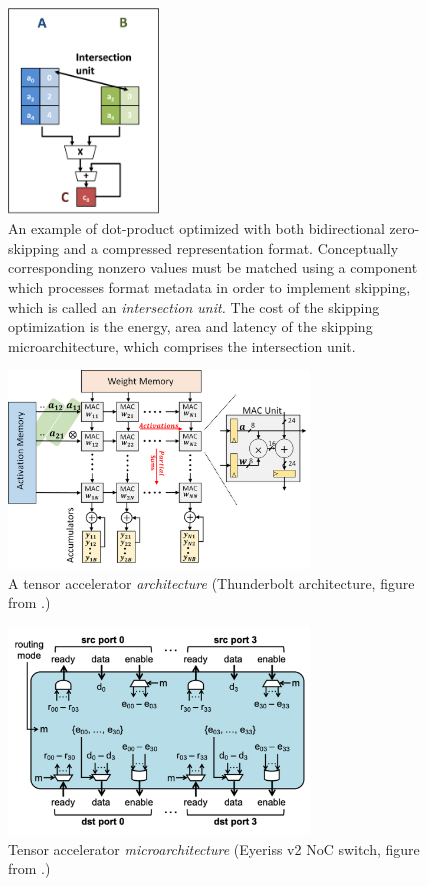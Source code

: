 %
%
\begin{figure}[h]
\includegraphics[width=4cm]{figures/saf_action_format_combo.PNG}
\caption{An example of dot-product optimized with both bidirectional zero-skipping and a compressed representation format. Conceptually corresponding nonzero values must be matched using a component which processes format metadata in order to implement skipping, which is called an \textit{intersection unit.} The cost of the skipping optimization is the energy, area and latency of the skipping microarchitecture, which comprises the intersection unit.}
\label{fig:saf_action_format_combo}
\centering
\end{figure}
%
%
\begin{figure}[h]
\includegraphics[width=8cm]{figures/arch_example.PNG}
\caption{A tensor accelerator \textit{architecture} (Thunderbolt architecture, figure from \cite{examplearch}.)}
\label{fig:saf_format_optimizations}
\end{figure}
%
%
\begin{figure}[h]
\includegraphics[width=8cm]{figures/uarch_example.PNG}
\caption{Tensor accelerator \textit{microarchitecture} (Eyeriss v2 NoC switch, figure from \cite{eyerissv2}.)}
\label{fig:saf_format_optimizations}
\end{figure}
